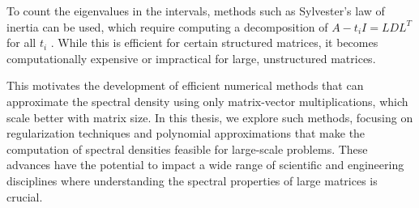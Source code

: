 To count the eigenvalues in the intervals, methods such as Sylvester's law of inertia can be used,
which require computing a decomposition of $A - t_i I = LDL^T$ for all $t_i$ \cite{golubvanloan}.
While this is efficient for certain structured matrices,
it becomes computationally expensive or impractical for large, unstructured matrices.

This motivates the development of efficient numerical methods that can approximate the spectral density
using only matrix-vector multiplications, which scale better with matrix size.
In this thesis, we explore such methods, focusing on regularization techniques and polynomial approximations
that make the computation of spectral densities feasible for large-scale problems.
These advances have the potential to impact a wide range of scientific and engineering disciplines
where understanding the spectral properties of large matrices is crucial.